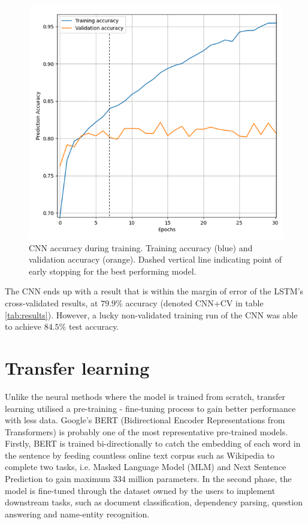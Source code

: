 \documentclass[journal, ]{IEEEtran}
\let\MYoriglatexcaption\caption
\renewcommand{\caption}[2][\relax]{\MYoriglatexcaption[#2]{#2}}
\begin{document}
\begin{figure}[hbt!]
  \centering
  \includegraphics[width=\linewidth]{imgs/CNN_ACC.png}
  \caption{CNN accuracy during training. Training accuracy (blue) and validation accuracy (orange). Dashed vertical line indicating point of early stopping for the best performing model.}
  \label{fig:cnn_acc}
\end{figure}

The CNN ends up with a result that is within the margin of error of the LSTM's cross-validated results, at $79.9$\% accuracy (denoted CNN+CV in table \ref{tab:results}). However, a lucky non-validated training run of the CNN was able to achieve $84.5$\% test accuracy.

\section{Transfer learning}
Unlike the neural methods where the model is trained from scratch, transfer learning utilised a pre-training - fine-tuning process to gain better performance with less data. Google's BERT (Bidirectional Encoder Representations from Transformers) is probably one of the most representative pre-trained models. Firstly, BERT is trained bi-directionally to catch the embedding of each word in the sentence by feeding countless online text corpus such as Wikipedia to complete two tasks, i.e. Masked Language Model (MLM) and Next Sentence Prediction\cite{devlin2018} to gain maximum 334 million parameters. In the second phase, the model is fine-tuned through the dataset owned by the users to implement downstream tasks, such as document classification, dependency parsing, question answering and name-entity recognition. 
\end{document}
